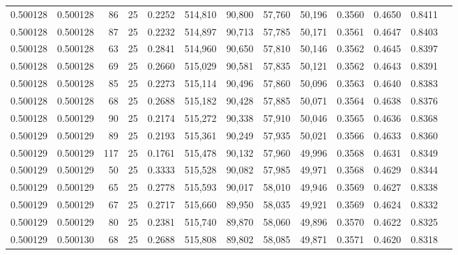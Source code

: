 \begin{tabular}{rrrrrrrrrrrrr}
0.500128 & 0.500128 &    86 &  25 &                                     0.2252 & 514,810 &  90,800 &  57,760 &  50,196 & 0.3560 & 0.4650 & 0.8411 \\
0.500128 & 0.500128 &    87 &  25 &                                     0.2232 & 514,897 &  90,713 &  57,785 &  50,171 & 0.3561 & 0.4647 & 0.8403 \\
0.500128 & 0.500128 &    63 &  25 &                                     0.2841 & 514,960 &  90,650 &  57,810 &  50,146 & 0.3562 & 0.4645 & 0.8397 \\
0.500128 & 0.500128 &    69 &  25 &                                     0.2660 & 515,029 &  90,581 &  57,835 &  50,121 & 0.3562 & 0.4643 & 0.8391 \\
0.500128 & 0.500128 &    85 &  25 &                                     0.2273 & 515,114 &  90,496 &  57,860 &  50,096 & 0.3563 & 0.4640 & 0.8383 \\
0.500128 & 0.500128 &    68 &  25 &                                     0.2688 & 515,182 &  90,428 &  57,885 &  50,071 & 0.3564 & 0.4638 & 0.8376 \\
0.500128 & 0.500129 &    90 &  25 &                                     0.2174 & 515,272 &  90,338 &  57,910 &  50,046 & 0.3565 & 0.4636 & 0.8368 \\
0.500129 & 0.500129 &    89 &  25 &                                     0.2193 & 515,361 &  90,249 &  57,935 &  50,021 & 0.3566 & 0.4633 & 0.8360 \\
0.500129 & 0.500129 &   117 &  25 &                                     0.1761 & 515,478 &  90,132 &  57,960 &  49,996 & 0.3568 & 0.4631 & 0.8349 \\
0.500129 & 0.500129 &    50 &  25 &                                     0.3333 & 515,528 &  90,082 &  57,985 &  49,971 & 0.3568 & 0.4629 & 0.8344 \\
0.500129 & 0.500129 &    65 &  25 &                                     0.2778 & 515,593 &  90,017 &  58,010 &  49,946 & 0.3569 & 0.4627 & 0.8338 \\
0.500129 & 0.500129 &    67 &  25 &                                     0.2717 & 515,660 &  89,950 &  58,035 &  49,921 & 0.3569 & 0.4624 & 0.8332 \\
0.500129 & 0.500129 &    80 &  25 &                                     0.2381 & 515,740 &  89,870 &  58,060 &  49,896 & 0.3570 & 0.4622 & 0.8325 \\
0.500129 & 0.500130 &    68 &  25 &                                     0.2688 & 515,808 &  89,802 &  58,085 &  49,871 & 0.3571 & 0.4620 & 0.8318 \\

\end{tabular}
